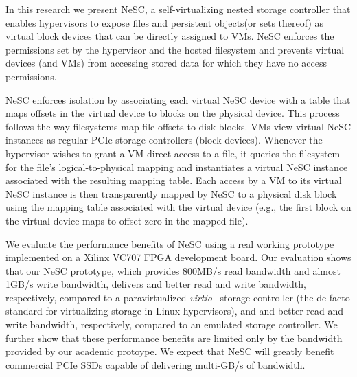 In this research we present NeSC, a self-virtualizing nested storage controller that enables hypervisors to expose files and persistent objects\footnotemark (or sets thereof) as virtual block devices that can be directly assigned to VMs. NeSC enforces the permissions set by the hypervisor and the hosted filesystem and prevents virtual devices (and VMs) from accessing stored data for which they have no access permissions.


NeSC enforces isolation by associating each virtual NeSC device with a table that maps offsets in the virtual device to blocks on the physical device. This process follows the way filesystems map file offsets to disk blocks.
%
VMs view virtual NeSC instances as regular PCIe storage controllers (block devices). Whenever the hypervisor wishes to grant a VM direct access to a file, it queries the filesystem for the file's logical-to-physical mapping and instantiates a virtual NeSC instance associated with the resulting mapping table.
%
Each access by a VM to its virtual NeSC instance is then transparently mapped by NeSC to a physical disk block using the mapping table associated with the virtual device (e.g., the first block on the virtual device maps to offset zero in the mapped file).

We evaluate the performance benefits of NeSC using a real working prototype implemented on a Xilinx VC707 FPGA development board. Our evaluation shows that our NeSC prototype, which provides 800MB/s read bandwidth and almost 1GB/s write bandwidth, delivers  and  better read and write bandwidth, respectively, compared to a paravirtualized \emph{virtio}~\cite{russell2008virtio} storage controller (the de facto standard for virtualizing storage in Linux hypervisors), and  and  better read and write bandwidth, respectively, compared to an emulated storage controller.
We further show that these performance benefits are limited only by the bandwidth provided by our academic protoype. We expect that NeSC will greatly benefit commercial PCIe SSDs capable of delivering multi-GB/s of bandwidth.






